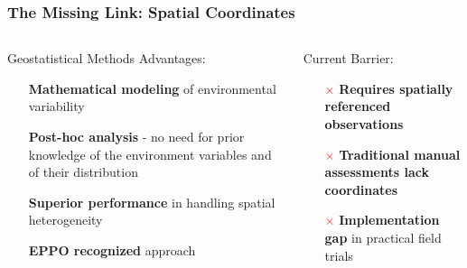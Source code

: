 \documentclass[aspectratio=43]{beamer}
\begin{document}
\begin{frame}
    \frametitle{The Missing Link: Spatial Coordinates}
    
    \begin{columns}
        \begin{column}{0.5\textwidth}
            \begin{block}{Geostatistical Methods Advantages:}
                \begin{itemize}
                    \item[\textcolor{green}{\checkmark}] \textbf{Mathematical modeling} of environmental variability
                    \item[\textcolor{green}{\checkmark}] \textbf{Post-hoc analysis} - no need for prior knowledge of the environment variables and of their distribution
                    \item[\textcolor{green}{\checkmark}] \textbf{Superior performance} in handling spatial heterogeneity
                    \item[\textcolor{green}{\checkmark}] \textbf{EPPO recognized} approach
                \end{itemize}
            \end{block}
        \end{column}
        
        \begin{column}{0.5\textwidth}
            \begin{alertblock}{Current Barrier:}
                \begin{itemize}
                    \item[\textcolor{red}{\(\times\)}] \textbf{Requires spatially referenced observations}
                    \item[\textcolor{red}{\(\times\)}] \textbf{Traditional manual assessments lack coordinates}
                    \item[\textcolor{red}{\(\times\)}] \textbf{Implementation gap} in practical field trials
                \end{itemize}
            \end{alertblock}
        \end{column}
    \end{columns}
\end{frame}
\end{document}
